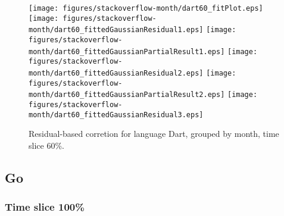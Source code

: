 \begin{figure}[hb]
\centering
{}
{\texttt{[image: figures/stackoverflow-month/dart60\_fitPlot.eps]}}
{\texttt{[image: figures/stackoverflow-month/dart60\_fittedGaussianResidual1.eps]}}
{\texttt{[image: figures/stackoverflow-month/dart60\_fittedGaussianPartialResult1.eps]}}
{\texttt{[image: figures/stackoverflow-month/dart60\_fittedGaussianResidual2.eps]}}
{\texttt{[image: figures/stackoverflow-month/dart60\_fittedGaussianPartialResult2.eps]}}
{\texttt{[image: figures/stackoverflow-month/dart60\_fittedGaussianResidual3.eps]}}
\caption{Residual-based corretion for language Dart, grouped by month, time slice 60\%.}
\end{figure}


\clearpage 
\newpage 


\subsection{Go}

\FloatBarrier

\subsubsection{Time slice 100\%}

